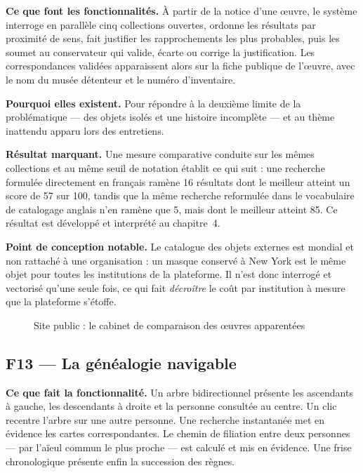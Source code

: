 \textbf{Ce que font les fonctionnalités.} À partir de la notice d'une œuvre, le
système interroge en parallèle cinq collections ouvertes, ordonne les résultats
par proximité de sens, fait justifier les rapprochements les plus probables,
puis les soumet au conservateur qui valide, écarte ou corrige la justification.
Les correspondances validées apparaissent alors sur la fiche publique de
l'œuvre, avec le nom du musée détenteur et le numéro d'inventaire.

\textbf{Pourquoi elles existent.} Pour répondre à la deuxième limite de la
problématique — des objets isolés et une histoire incomplète — et au thème
inattendu apparu lors des entretiens.

\textbf{Résultat marquant.} Une mesure comparative conduite sur les mêmes
collections et au même seuil de notation établit ce qui suit : une recherche
formulée directement en français ramène 16 résultats dont le meilleur atteint un
score de 57 sur 100, tandis que la même recherche reformulée dans le vocabulaire
de catalogage anglais n'en ramène que 5, mais dont le meilleur atteint 85. Ce
résultat est développé et interprété au chapitre~4.

\textbf{Point de conception notable.} Le catalogue des objets externes est
mondial et non rattaché à une organisation : un masque conservé à New York est
le même objet pour toutes les institutions de la plateforme. Il n'est donc
interrogé et vectorisé qu'une seule fois, ce qui fait \emph{décroître} le coût
par institution à mesure que la plateforme s'étoffe.

\begin{figure}[htbp]
\centering
{}
\caption{Site public : le cabinet de comparaison des œuvres apparentées}
\label{fig:cap-freres}
\end{figure}

\subsection{F13 — La généalogie navigable}

\textbf{Ce que fait la fonctionnalité.} Un arbre bidirectionnel présente les
ascendants à gauche, les descendants à droite et la personne consultée au
centre. Un clic recentre l'arbre sur une autre personne. Une recherche
instantanée met en évidence les cartes correspondantes. Le chemin de filiation
entre deux personnes — par l'aïeul commun le plus proche — est calculé et mis en
évidence. Une frise chronologique présente enfin la succession des règnes.

